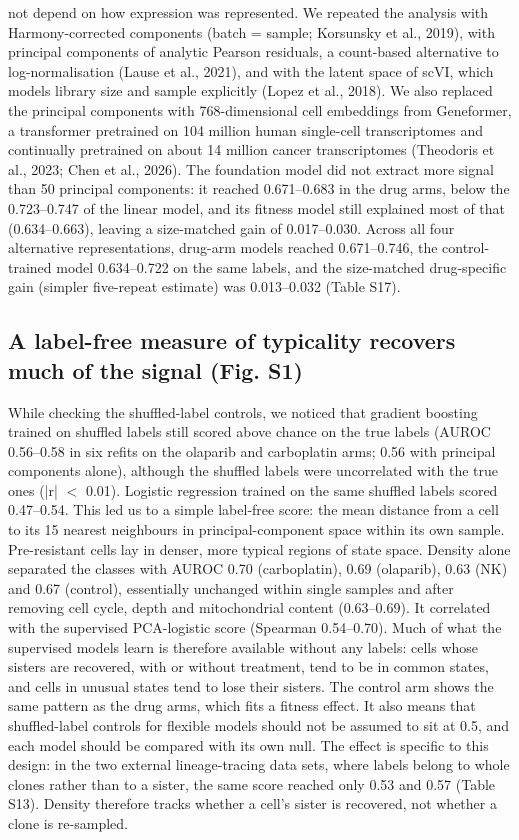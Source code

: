 \documentclass[11pt,a4paper]{article}
\begin{document}
not depend on how expression was represented. We repeated the analysis with Harmony-corrected components (batch = sample; Korsunsky et al., 2019), with principal components of analytic Pearson residuals, a count-based alternative to log-normalisation (Lause et al., 2021), and with the latent space of scVI, which models library size and sample explicitly (Lopez et al., 2018). We also replaced the principal components with 768-dimensional cell embeddings from Geneformer, a transformer pretrained on 104 million human single-cell transcriptomes and continually pretrained on about 14 million cancer transcriptomes (Theodoris et al., 2023; Chen et al., 2026). The foundation model did not extract more signal than 50 principal components: it reached 0.671--0.683 in the drug arms, below the 0.723--0.747 of the linear model, and its fitness model still explained most of that (0.634--0.663), leaving a size-matched gain of 0.017--0.030. Across all four alternative representations, drug-arm models reached 0.671--0.746, the control-trained model 0.634--0.722 on the same labels, and the size-matched drug-specific gain (simpler five-repeat estimate) was 0.013--0.032 (Table S17).

\subsection*{A label-free measure of typicality recovers much of the signal (Fig. S1)}

While checking the shuffled-label controls, we noticed that gradient boosting trained on shuffled labels still scored above chance on the true labels (AUROC 0.56--0.58 in six refits on the olaparib and carboplatin arms; 0.56 with principal components alone), although the shuffled labels were uncorrelated with the true ones (|r| $<$ 0.01). Logistic regression trained on the same shuffled labels scored 0.47--0.54. This led us to a simple label-free score: the mean distance from a cell to its 15 nearest neighbours in principal-component space within its own sample. Pre-resistant cells lay in denser, more typical regions of state space. Density alone separated the classes with AUROC 0.70 (carboplatin), 0.69 (olaparib), 0.63 (NK) and 0.67 (control), essentially unchanged within single samples and after removing cell cycle, depth and mitochondrial content (0.63--0.69). It correlated with the supervised PCA-logistic score (Spearman 0.54--0.70). Much of what the supervised models learn is therefore available without any labels: cells whose sisters are recovered, with or without treatment, tend to be in common states, and cells in unusual states tend to lose their sisters. The control arm shows the same pattern as the drug arms, which fits a fitness effect. It also means that shuffled-label controls for flexible models should not be assumed to sit at 0.5, and each model should be compared with its own null. The effect is specific to this design: in the two external lineage-tracing data sets, where labels belong to whole clones rather than to a sister, the same score reached only 0.53 and 0.57 (Table S13). Density therefore tracks whether a cell's sister is recovered, not whether a clone is re-sampled.
\end{document}
